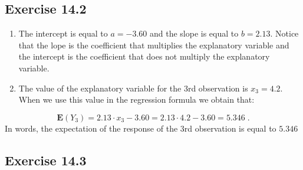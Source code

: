 \documentclass[]{krantz}
\newcommand{\Expec}{\mathbf{E}}
\theoremstyle{definition}
\theoremstyle{definition}
\theoremstyle{definition}
\theoremstyle{remark}
\begin{document}
\hypertarget{exercise-14.2}{%
\subsection*{Exercise 14.2}\label{exercise-14.2}}


\begin{enumerate}
\def\labelenumi{\arabic{enumi}.}
\item
  The intercept is equal to
  \(a = -3.60\) and the slope is equal to \(b = 2.13\). Notice that the lope
  is the coefficient that multiplies the explanatory variable and the
  intercept is the coefficient that does not multiply the explanatory
  variable.
\item
  The value of the explanatory
  variable for the 3rd observation is \(x_3 = 4.2\). When we use this value
  in the regression formula we obtain that:
\end{enumerate}

\[\Expec(Y_3) = 2.13 \cdot x_3 - 3.60 = 2.13 \cdot 4.2 - 3.60 = 5.346\;.\]
In words, the expectation of the response of the 3rd observation is
equal to \(5.346\)

\hypertarget{exercise-14.3}{%
\subsection*{Exercise 14.3}\label{exercise-14.3}}
\end{document}
